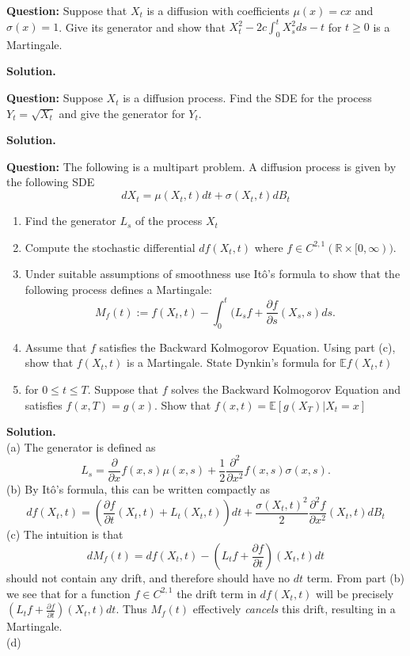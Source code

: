 \documentclass{article}
\begin{document}
\begin{tcolorbox}[colframe=black,colback=gray!5,boxrule=0.5pt]
\textbf{Question:} Suppose that $X_t$ is a diffusion with coefficients $\mu(x) = cx$ and $\sigma(x)=1$. Give its generator and show that $X_t^2-2c\int_0^tX_s^2ds-t$ for $t\geq0$ is a Martingale.
\end{tcolorbox}
\textbf{Solution.}

\begin{tcolorbox}[colframe=black,colback=gray!5,boxrule=0.5pt]
\textbf{Question:} Suppose $X_t$ is a diffusion process. Find the SDE for the process $Y_t = \sqrt{X_t}$ and give the generator for $Y_t$.
\end{tcolorbox}
\textbf{Solution.}


\begin{tcolorbox}[colframe=black,colback=gray!5,boxrule=0.5pt]
\textbf{Question:} The following is a multipart problem. A diffusion process is given by the following SDE 
$$dX_t = \mu(X_t,t)dt + \sigma(X_t,t)dB_t$$
\begin{enumerate}[label=(\alph*)]
    \item Find the generator $L_s$ of the process $X_t$
    \item Compute the stochastic differential $df(X_t,t)$ where $f\in C^{2,1}(\mathbb{R}\times[0,\infty))$. 
    \item Under suitable assumptions of smoothness use Itô's formula to show that the following process defines a Martingale:
    $$M_f(t):=f(X_t,t)-\int_0^t(L_sf+\frac{\partial f}{\partial s}(X_s,s)ds.$$
    \item Assume that $f$ satisfies the Backward Kolmogorov Equation. Using part (c), show that $f(X_t,t)$ is a Martingale. State Dynkin's formula for $\mathbb{E}f(X_t,t)$
    \item for $0\leq t\leq T$. Suppose that $f$ solves the Backward Kolmogorov Equation and satisfies $f(x,T)=g(x)$. Show that $f(x,t) = \mathbb{E}[g(X_T)|X_t=x]$
\end{enumerate}
\end{tcolorbox}
\textbf{Solution.} \\
(a) The generator is defined as
$$L_s = \frac{\partial}{\partial x}f(x,s)\mu(x,s) + \frac{1}{2}\frac{\partial^2}{\partial x^2}f(x,s)\sigma(x,s).$$
(b) By Itô's formula, this can be written compactly as 
$$df(X_t,t) = \left(\frac{\partial f}{\partial t}(X_t,t) + L_t(X_t,t)\right)dt + \frac{\sigma(X_t,t)^2}{2}\frac{\partial^2 f}{\partial x^2}(X_t,t)dB_t$$
(c) The intuition is that $$dM_f(t) = df(X_t,t) - (L_tf+\frac{\partial f}{\partial t})(X_t,t)dt$$ 
should not contain any drift, and therefore should have no $dt$ term. From part (b) we see that for a function $f\in C^{2,1}$ the drift term in $df(X_t,t)$ will be precisely $(L_tf+\frac{\partial f}{\partial t})(X_t,t)dt$. Thus $M_f(t)$ effectively \textit{cancels} this drift, resulting in a Martingale. \\
(d)
\end{document}
